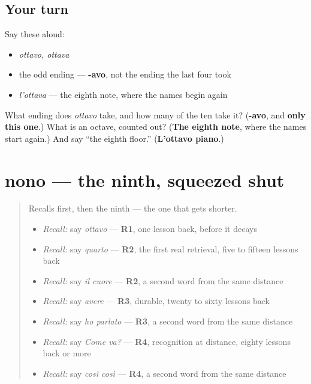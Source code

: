 \subsection*{Your turn}
Say these aloud:

\begin{itemize}
\raggedright
  \item \emph{ottavo, ottava}
  \item the odd ending — \textbf{-avo}, not the ending the last four took
  \item \emph{l'ottava} — the eighth note, where the names begin again
\end{itemize}

\begin{tcolorbox}[breakable,colback=teal!4,colframe=teal!35!black,title={Before you move on}]
What ending does \emph{ottavo} take, and how many of the ten take it? (\textbf{-avo}, and \textbf{only this one}.) What is an octave, counted out? (\textbf{The eighth note}, where the names start again.) And say \textquotedblleft{}the eighth floor.\textquotedblright{} (\textbf{L'ottavo piano}.)
\end{tcolorbox}
\section[nono / nona]{nono — the ninth, squeezed shut}

\label{lesson:IT-C27-nono}



\begin{quote}
Recalls first, then the ninth — the one that gets shorter.

\begin{itemize}
\raggedright
  \item \emph{Recall:} say \emph{ottavo} — \textbf{R1}, one lesson back, before it decays
  \item \emph{Recall:} say \emph{quarto} — \textbf{R2}, the first real retrieval, five to fifteen lessons back
  \item \emph{Recall:} say \emph{il cuore} — \textbf{R2}, a second word from the same distance
  \item \emph{Recall:} say \emph{avere} — \textbf{R3}, durable, twenty to sixty lessons back
  \item \emph{Recall:} say \emph{ho parlato} — \textbf{R3}, a second word from the same distance
  \item \emph{Recall:} say \emph{Come va?} — \textbf{R4}, recognition at distance, eighty lessons back or more
  \item \emph{Recall:} say \emph{così così} — \textbf{R4}, a second word from the same distance
\end{itemize}
\end{quote}

